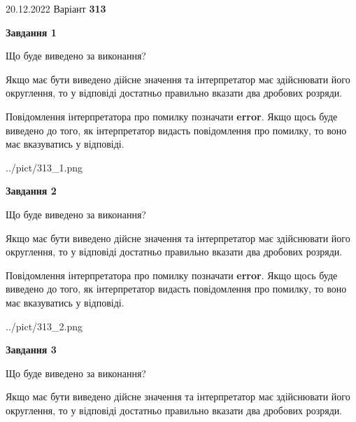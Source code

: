 \documentclass[12pt, ukrainian]{article}
\begin{document}
{20.12.2022 Варіант \No \textbf { 313 }\par}
{
\begin {Large}

{\begin {center}\textbf{Завдання 1}\end {center}}\par
Що буде виведено за виконання? \par

Якщо має бути виведено дійсне значення та інтерпретатор має здійснювати його округлення, 
то у відповіді достатньо правильно вказати два дробових розряди.

Повідомлення інтерпретатора про помилку позначати \textbf{error}.
Якщо щось буде виведено до того, як інтерпретатор видасть повідомлення про помилку, 
то воно має вказуватись у відповіді. \par

\begin{center}
	{../pict/313_1.png}
\end{center}
\newpage

{\begin {center}\textbf{Завдання 2}\end {center}}\par
Що буде виведено за виконання? \par

Якщо має бути виведено дійсне значення та інтерпретатор має здійснювати його округлення, 
то у відповіді достатньо правильно вказати два дробових розряди.

Повідомлення інтерпретатора про помилку позначати \textbf{error}.
Якщо щось буде виведено до того, як інтерпретатор видасть повідомлення про помилку, 
то воно має вказуватись у відповіді. \par

\begin{center}
	{../pict/313_2.png}
\end{center}
\newpage

{\begin {center}\textbf{Завдання 3}\end {center}}\par
Що буде виведено за виконання? \par

Якщо має бути виведено дійсне значення та інтерпретатор має здійснювати його округлення, 
то у відповіді достатньо правильно вказати два дробових розряди.


\end{Large}}
\end{document}
